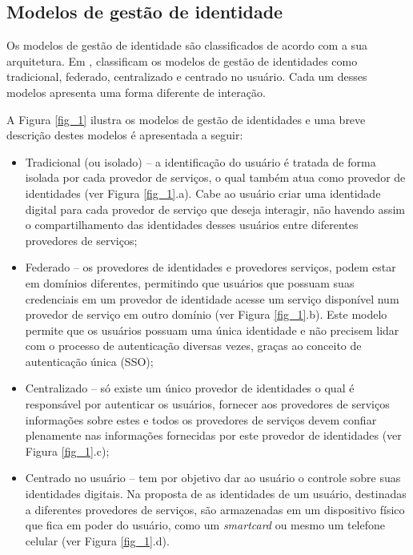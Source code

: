 \subsection{Modelos de gestão de identidade}
\label{ss_c2_modelos}

Os modelos de gestão de identidade são classificados de acordo com a sua arquitetura. Em \cite{josan:05, pope:05, bhargav:07}, classificam os modelos de gestão de identidades como tradicional, federado, centralizado e centrado no usuário. Cada um desses modelos apresenta uma forma diferente de interação.

A Figura \ref{fig_1} ilustra os modelos de gestão de identidades e uma breve descrição destes modelos é apresentada a seguir:

\begin{itemize}
 \item Tradicional (ou isolado) -- a identificação do usuário é tratada de forma isolada por cada provedor de serviços, o qual também atua como provedor de identidades (ver Figura \ref{fig_1}.a). Cabe ao usuário criar uma identidade digital para cada provedor de serviço que deseja interagir, não havendo assim o compartilhamento das identidades desses usuários entre diferentes provedores de serviços;
 \item Federado -- os provedores de identidades e provedores serviços, podem estar em domínios diferentes, permitindo que usuários que possuam suas credenciais em um provedor de identidade acesse um serviço disponível num provedor de serviço em outro domínio (ver Figura \ref{fig_1}.b). Este modelo permite que os usuários possuam uma única identidade e não precisem lidar com o processo de autenticação diversas vezes, graças ao conceito de autenticação única (SSO);
 \item Centralizado -- só existe um único provedor de identidades o qual é responsável por autenticar os usuários, fornecer aos provedores de serviços informações sobre estes e todos os provedores de serviços devem confiar plenamente nas informações fornecidas por este provedor de identidades (ver Figura \ref{fig_1}.c); 
 \item Centrado no usuário -- tem por objetivo dar ao usuário o controle sobre suas identidades digitais. Na proposta de \cite{pope:05} as identidades de um usuário, destinadas a diferentes provedores de serviços, são armazenadas em um dispositivo físico que fica em poder do usuário, como um \textit{smartcard} ou mesmo um telefone celular (ver Figura \ref{fig_1}.d).
\end{itemize}

